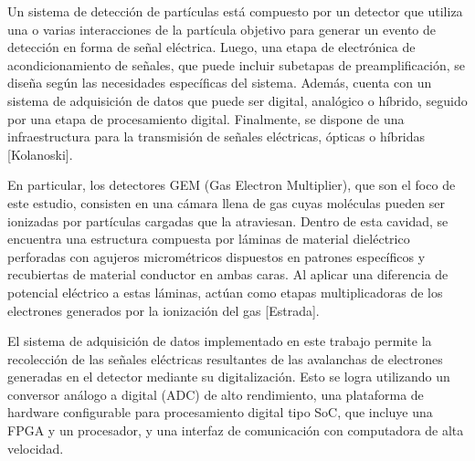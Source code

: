 \documentclass[]{book}
\begin{document}
\noindent Un sistema de detección de partículas está compuesto por un detector que utiliza una o varias interacciones de la partícula objetivo para generar un evento de detección en forma de señal eléctrica. Luego, una etapa de electrónica de acondicionamiento de señales, que puede incluir subetapas de preamplificación, se diseña según las necesidades específicas del sistema. Además, cuenta con un sistema de adquisición de datos que puede ser digital, analógico o híbrido, seguido por una etapa de procesamiento digital. Finalmente, se dispone de una infraestructura para la transmisión de señales eléctricas, ópticas o híbridas [Kolanoski].

\noindent En particular, los detectores GEM (Gas Electron Multiplier), que son el foco de este estudio, consisten en una cámara llena de gas cuyas moléculas pueden ser ionizadas por partículas cargadas que la atraviesan. Dentro de esta cavidad, se encuentra una estructura compuesta por láminas de material dieléctrico perforadas con agujeros micrométricos dispuestos en patrones específicos y recubiertas de material conductor en ambas caras. Al aplicar una diferencia de potencial eléctrico a estas láminas, actúan como etapas multiplicadoras de los electrones generados por la ionización del gas [Estrada].

\noindent El sistema de adquisición de datos implementado en este trabajo permite la recolección de las señales eléctricas resultantes de las avalanchas de electrones generadas en el detector mediante su digitalización. Esto se logra utilizando un conversor análogo a digital (ADC) de alto rendimiento, una plataforma de hardware configurable para procesamiento digital tipo SoC, que incluye una FPGA y un procesador, y una interfaz de comunicación con computadora de alta velocidad.
\end{document}

